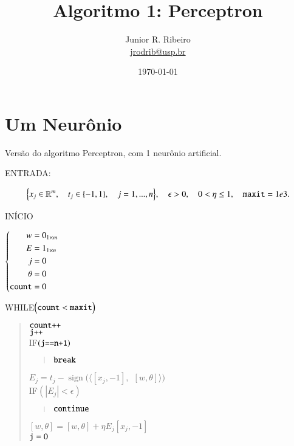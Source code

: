 \documentclass[12pt,a4paper]{article}
\title{Algoritmo 1: Perceptron}
\author{Junior R. Ribeiro \\ \url{jrodrib@usp.br}}
\date{\today}
\DeclareMathOperator{\sign}{sign}
\newcommand{\txt}[1]{\mbox{\texttt{#1}}}
\begin{document}
\maketitle
\tableofcontents

\section{Um Neurônio}
Versão do algoritmo Perceptron, com 1 neurônio artificial.

ENTRADA: 

\[
\Big\{x_j\in\mathbb{R}^m,\quad t_j\in\{-1,1\},\quad j=1,...,n\Big\}, \quad \epsilon>0, \quad 0<\eta\le 1, \quad \txt{maxit}=1e3.
\]

INÍCIO

$\left\{
\begin{aligned}
w&=0_{1\times m}
\\
E &= 1_{1\times n}
\\
j&=0
\\
\theta &= 0
\\
\txt{count}&=0
\end{aligned}
\right.
$

WHILE$\Big( \txt{count}<\txt{maxit}\Big)$\\[-24pt]
\begin{quote}
$\txt{count++}$\\
$\txt{j++}$\\
IF$(\txt{j==n+1})$\\[-22pt]
\begin{quote}
$\txt{break}$
\end{quote}
$E_j = t_j-\sign\Big(\big\langle[x_j,-1],\ \ [w,\theta]\big\rangle\Big)$\\
IF$(|E_j|<\epsilon)$\\[-24pt]
\begin{quote}
$\txt{continue}$
\end{quote}
$[w,\theta]=[w,\theta]+\eta E_j[x_j,-1]$\\
$\txt{j}=0$


\end{quote}
\end{document}
